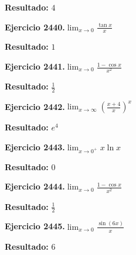 \documentclass[10pt,a4paper]{article}
\begin{document}
\begin{solbox}
\textbf{Resultado:} \(\displaystyle 4\)
\end{solbox}

\begin{ejbox}
\textbf{Ejercicio 2440.}\quad $\lim_{x\to 0} \frac{\tan x}{x}$
\end{ejbox}

\begin{solbox}
\textbf{Resultado:} \(\displaystyle 1\)
\end{solbox}

\begin{ejbox}
\textbf{Ejercicio 2441.}\quad $\lim_{x\to 0} \frac{1-\cos x}{x^2}$
\end{ejbox}

\begin{solbox}
\textbf{Resultado:} \(\displaystyle \frac{1}{2}\)
\end{solbox}

\newpage
\begin{ejbox}
\textbf{Ejercicio 2442.}\quad $\lim_{x\to \infty} \left(\frac{x+4}{x}\right)^{x}$
\end{ejbox}

\begin{solbox}
\textbf{Resultado:} \(\displaystyle e^{4}\)
\end{solbox}

\begin{ejbox}
\textbf{Ejercicio 2443.}\quad $\lim_{x\to 0^+} x\ln x$
\end{ejbox}

\begin{solbox}
\textbf{Resultado:} \(\displaystyle 0\)
\end{solbox}

\begin{ejbox}
\textbf{Ejercicio 2444.}\quad $\lim_{x\to 0} \frac{1-\cos x}{x^2}$
\end{ejbox}

\begin{solbox}
\textbf{Resultado:} \(\displaystyle \frac{1}{2}\)
\end{solbox}

\newpage
\begin{ejbox}
\textbf{Ejercicio 2445.}\quad $\lim_{x\to 0} \frac{\sin(6x)}{x}$
\end{ejbox}

\begin{solbox}
\textbf{Resultado:} \(\displaystyle 6\)
\end{solbox}
\end{document}

